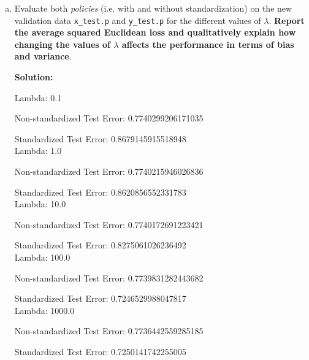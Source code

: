 \documentclass{article}
\newenvironment{solution}{\color{blue} \smallskip \textbf{Solution:}}{}
\begin{document}
\begin{enumerate}[(a)]
    \begin{solution}

Lambda: 0.1, Training Error: 3.25592934685693e-07

Lambda: 1.0, Training Error: 2.9105343334579686e-05

Lambda: 10.0, Training Error: 0.001590383483089189

Lambda: 100.0, Training Error: 0.03477312478925273

Lambda: 1000.0, Training Error: 0.25440296240987653

    \end{solution}

    \newpage
    \item Evaluate both \emph{policies} (i.e. with and without standardization) on the new validation data \texttt{x\_test.p} and \texttt{y\_test.p} for the different values of $\lambda$. \textbf{Report the average squared Euclidean loss and qualitatively explain how changing the values of $\lambda$ affects the performance in terms of bias and variance}. 
    
    \begin{solution}

Lambda: 0.1

  Non-standardized Test Error: 0.7740299206171035
  
  Standardized Test Error: 0.8679145915518948 \\
  
Lambda: 1.0

  Non-standardized Test Error: 0.7740215946026836
  
  Standardized Test Error: 0.8620856552331783 \\
  
Lambda: 10.0

  Non-standardized Test Error: 0.7740172691223421
  
  Standardized Test Error: 0.8275061026236492 \\
  
Lambda: 100.0

  Non-standardized Test Error: 0.7739831282443682
  
  Standardized Test Error: 0.7246529988047817 \\
  
Lambda: 1000.0

  Non-standardized Test Error: 0.7736442559285185
  
  Standardized Test Error: 0.7250141742255005 \\
  

\end{solution}
\end{enumerate}
\end{document}
